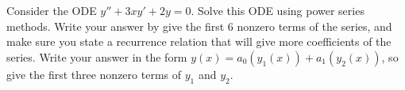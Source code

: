 % 
% 

% 
\begin{problem}
 Consider the ODE $y''+3xy'+2y=0$. Solve this ODE using power series methods. Write your answer by give the first 6 nonzero terms of the series, and make sure you state a recurrence relation that will give more coefficients of the series. Write your answer in the form $y(x) =a_0 (y_1(x))+a_1(y_2(x))$, so give the first three nonzero terms of $y_1$ and $y_2$. 
\end{problem}

